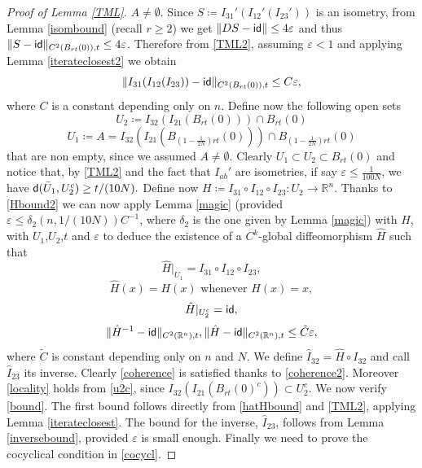 \documentclass[11pt]{article}
\newcommand{\eps}{\varepsilon}
\newcommand{\rr}{\mathbb{R}}
\newcommand{\sfd}{{\sf d}}
\newcommand{\id}{{\sf id}}
\theoremstyle{plain}
\theoremstyle{definition}
\numberwithin{equation}{section}
\begin{document}
\begin{proof}[Proof of Lemma \ref{TML}]
	 $A\neq \emptyset$.
	Since $S\coloneqq I_{31}'( I_{12}'(I_{23}'))$ is an isometry, from Lemma \ref{isombound} (recall $r \ge 2$) we get $\|DS-{\sf{id}} \|\le 4\eps$ and thus $\|S-{\sf{id}}\|_{C^2(B_{rt}(0)),t}\le 4\eps$. Therefore from \eqref{TML2}, assuming $\eps <1$ and applying Lemma \ref{iterateclosest2} we obtain
	\begin{equation} \label{Hbound2}
		\|I_{31}( I_{12}(I_{23}))-{\sf{id}}\|_{C^2(B_{rt}(0)),t}\le C\eps,
	\end{equation}
	where $C$ is a constant depending only on $n$.
	Define now the following open sets
	\[ U_2\coloneqq  I_{32}(I_{21}(B_{rt}(0)))\cap B_{rt}(0) \]
	\[ U_1\coloneqq A= I_{32}(I_{21}(B_{(1-\frac{1}{2N})rt}(0)))\cap B_{(1-\frac{1}{2N})rt}(0) \]
	that are non empty, since we assumed $A\neq \emptyset.$
	Clearly $U_1 \subset U_2\subset B_{rt}(0)$ and notice that, by \eqref{TML2} and the fact that $I_{ab}'$ are isometries, if say $\eps \le \frac{1}{100N}$, we have $\sfd(\bar U_1, U_2^c)\ge t/(10N).$ Define now $H\coloneqq  I_{31}\circ  I_{12} \circ I_{23}: U_2 \to \rr^n$.  Thanks to  \eqref{Hbound2} we can now apply Lemma \ref{magic} (provided $\eps \le \delta_2(n,1/(10N))C^{-1}$, where $\delta_2$ is the one given by Lemma \ref{magic}) with $H$, with $U_1$,$U_2$,$t$ and $\eps$ to deduce the existence of  a $C^k$-global diffeomorphism $\hat H$ such that
	\begin{equation}\label{restr}
		\hat H|_{U_1}= I_{31}\circ  I_{12} \circ  I_{23},
	\end{equation}
	\begin{equation}\label{coherence2}
		\hat H(x)=H(x) \text{ whenever }  H(x)=x ,
	\end{equation}
	\begin{equation}\label{u2c}
		\hat H|_{U_2^c} = \id,
	\end{equation}
	\begin{equation}\label{hatHbound}
		\|\hat H^{-1}-{\sf{id}}\|_{C^2(\rr^n),t}, \|\hat H-{\sf{id}}\|_{C^2(\rr^n),t}\le \tilde C\eps,  
	\end{equation}
	where $\tilde C$ is constant depending only on $n$ and $N$.
	We define $ \hat I_{32}=\hat H \circ   I_{32}$ and call $\hat I_{23}$ its inverse. Clearly \eqref{coherence} is satisfied thanks to \eqref{coherence2}. Moreover \eqref{locality} holds from \eqref{u2c}, since $I_{32}(I_{21}(B_{rt}(0)^c))\subset U_2^c$.  We now verify \eqref{bound}. The first bound follows directly from \eqref{hatHbound} and \eqref{TML2}, applying Lemma \ref{iterateclosest}. The bound for the inverse, $\hat I_{23}$, follows from Lemma \ref{inversebound}, provided $\eps$ is small enough. Finally we need to prove the cocyclical condition in \eqref{cocycl}. 

\end{proof}
\end{document}
